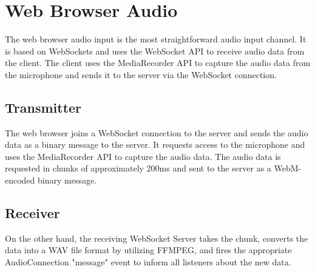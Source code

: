 \section{Web Browser Audio}

The web browser audio input is the most straightforward audio input channel. It is based on WebSockets and
uses the WebSocket API to receive audio data from the client. The client uses the MediaRecorder API to capture the 
audio data from the microphone and sends it to the server via the WebSocket connection.

\subsection{Transmitter}

The web browser joins a WebSocket connection to the server and sends the audio data as a binary message to the server. 
It requests access to the microphone and uses the MediaRecorder API to capture the audio data. 
The audio data is requested in chunks of approximately 200ms and sent to the server as a WebM-encoded binary message.

\subsection{Receiver}

On the other hand, the receiving WebSocket Server takes the chunk, converts the data into a WAV file format by 
utilizing FFMPEG, and fires the appropriate AudioConnection "message" event to inform all listeners about the new data.

